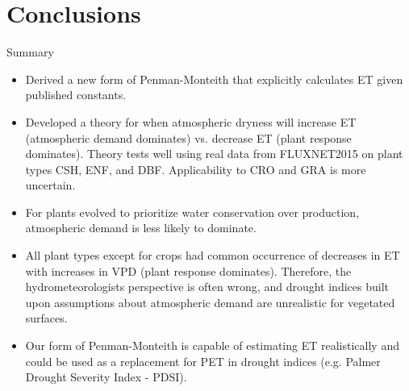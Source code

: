 \documentclass{beamer}
\begin{document}
\section{Conclusions}


\begin{frame}{Summary}
  \small
  \begin{itemize}
  \item Derived a new form of Penman-Monteith that explicitly calculates ET given published constants.
  \item Developed a theory for when atmospheric dryness will increase ET (atmospheric demand dominates) vs. decrease ET (plant response dominates). Theory tests well using real data from FLUXNET2015 on plant types CSH, ENF, and DBF. Applicability to CRO and GRA is more uncertain.
  \item For plants evolved to prioritize water conservation over production, atmospheric demand is less likely to dominate.
  \item All plant types except for crops had common occurrence of decreases in ET with increases in VPD (plant response dominates). Therefore, the hydrometeorologists perspective is often wrong, and drought indices built upon assumptions about atmospheric demand are unrealistic for vegetated surfaces.
  \item Our form of Penman-Monteith is capable of estimating ET realistically and could be used as a replacement for PET in drought indices (e.g. Palmer Drought Severity Index - PDSI).
  \end{itemize}
\end{frame}
\end{document}

